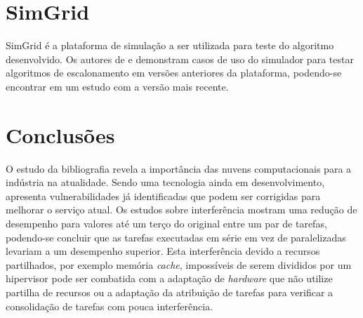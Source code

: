 \section{SimGrid}\label{sec:simgrid} 
SimGrid é a plataforma de simulação a ser utilizada para teste do algoritmo desenvolvido. Os autores de \cite{casanova2001sg} e \cite{legrand2003sg} demonstram casos de uso do simulador para testar algoritmos de escalonamento em versões anteriores da plataforma, podendo-se encontrar em \cite{casanova2008sg} um estudo com a versão mais recente. 


\section{Conclusões}
O estudo da bibliografia revela a importância das nuvens computacionais para a indústria na atualidade. Sendo uma tecnologia ainda em desenvolvimento, apresenta vulnerabilidades já identificadas que podem ser corrigidas para melhorar o serviço atual. Os estudos sobre interferência mostram uma redução de desempenho para valores até um terço do original entre um par de tarefas, podendo-se concluir que as tarefas executadas em série em vez de paralelizadas levariam a um desempenho superior. Esta interferência devido a recursos partilhados, por exemplo memória \textit{cache}, impossíveis de serem divididos por um hipervisor pode ser combatida com a adaptação de \textit{hardware} que não utilize partilha de recursos ou a adaptação da atribuição de tarefas para verificar a consolidação de tarefas com pouca interferência. 


